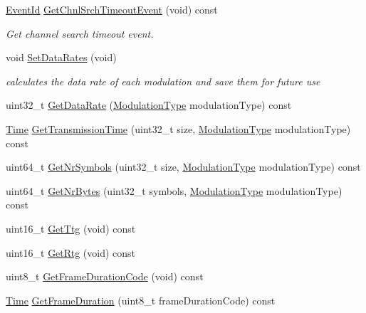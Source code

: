 \begin{DoxyCompactItemize}
\hyperlink{classns3_1_1EventId}{Event\+Id} \hyperlink{classns3_1_1WimaxPhy_aa6cd68463e3bac25e2e5588aefe8c6fa}{Get\+Chnl\+Srch\+Timeout\+Event} (void) const 
\begin{DoxyCompactList}\small\item\em Get channel search timeout event. \end{DoxyCompactList}\item 
void \hyperlink{classns3_1_1WimaxPhy_a8a67bc510ab6ba4d3e9cec3e823f98a1}{Set\+Data\+Rates} (void)
\begin{DoxyCompactList}\small\item\em calculates the data rate of each modulation and save them for future use \end{DoxyCompactList}\item 
uint32\+\_\+t \hyperlink{classns3_1_1WimaxPhy_a1f7bec1ea91e76fdccd61c4d7b56ca4f}{Get\+Data\+Rate} (\hyperlink{classns3_1_1WimaxPhy_a044c5d8a48ca992c39c2a946f6e755fa}{Modulation\+Type} modulation\+Type) const 
\item 
\hyperlink{classns3_1_1Time}{Time} \hyperlink{classns3_1_1WimaxPhy_a177976690291d9897ea4edd5f9c89b71}{Get\+Transmission\+Time} (uint32\+\_\+t size, \hyperlink{classns3_1_1WimaxPhy_a044c5d8a48ca992c39c2a946f6e755fa}{Modulation\+Type} modulation\+Type) const 
\item 
uint64\+\_\+t \hyperlink{classns3_1_1WimaxPhy_ac8a102286fab9f996bc50e48f5e46006}{Get\+Nr\+Symbols} (uint32\+\_\+t size, \hyperlink{classns3_1_1WimaxPhy_a044c5d8a48ca992c39c2a946f6e755fa}{Modulation\+Type} modulation\+Type) const 
\item 
uint64\+\_\+t \hyperlink{classns3_1_1WimaxPhy_ac26974983c61a94446133d49abbe6933}{Get\+Nr\+Bytes} (uint32\+\_\+t symbols, \hyperlink{classns3_1_1WimaxPhy_a044c5d8a48ca992c39c2a946f6e755fa}{Modulation\+Type} modulation\+Type) const 
\item 
uint16\+\_\+t \hyperlink{classns3_1_1WimaxPhy_af28f35c354bbd7210afd9b957ba69e5c}{Get\+Ttg} (void) const 
\item 
uint16\+\_\+t \hyperlink{classns3_1_1WimaxPhy_add35d8c27ff2ad26369d9b130e10b25e}{Get\+Rtg} (void) const 
\item 
uint8\+\_\+t \hyperlink{classns3_1_1WimaxPhy_a23e92e25faa172fad7e518e9014f11ba}{Get\+Frame\+Duration\+Code} (void) const 
\item 
\hyperlink{classns3_1_1Time}{Time} \hyperlink{classns3_1_1WimaxPhy_a83d9a1083b8cd148fdcaccda8a684297}{Get\+Frame\+Duration} (uint8\+\_\+t frame\+Duration\+Code) const 
\item 

\end{DoxyCompactItemize}
